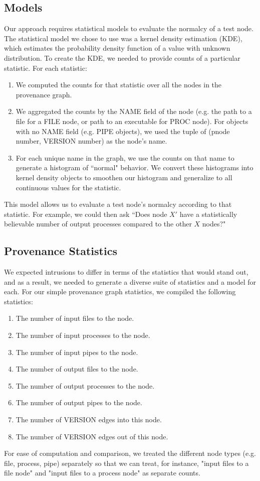 \documentclass[10pt,twocolumn]{article}
\begin{document}
\subsection{Models}
Our approach requires statistical models to evaluate the normalcy of a test node. The statistical model we chose to use was a kernel density estimation (KDE), which estimates the probability density function of a value with unknown distribution. To create the KDE, we needed to provide counts of a particular statistic. For each statistic:
\begin{enumerate}
\item We computed the counts for that statistic over all the nodes in the provenance graph.
\item We aggregated the counts by the NAME field of the node (e.g. the path to a file for a FILE node, or path to an executable for PROC node). For objects with no NAME field (e.g. PIPE objects), we used the tuple of (pnode number, VERSION number) as the node's name.
\item For each unique name in the graph, we use the counts on that name to generate a histogram of ``normal" behavior. We convert these histograms into kernel density objects to smoothen our histogram and generalize to all continuous values for the statistic.
\end{enumerate}

This model allows us to evaluate a test node's normalcy according to that statistic. For example, we could then ask ``Does node $X'$ have a statistically believable number of output processes compared to the other $X$ nodes?"

\subsection{Provenance Statistics}
We expected intrusions to differ in terms of the statistics that would stand out, and as a result, we needed to generate a diverse suite of statistics and a model for each. For our simple provenance graph statistics, we compiled the following statistics:
\begin{enumerate}
\item The number of input files to the node.
\item The number of input processes to the node.
\item The number of input pipes to the node.
\item The number of output files to the node.
\item The number of output processes to the node.
\item The number of output pipes to the node.
\item The number of VERSION edges into this node.
\item The number of VERSION edges out of this node.
\end{enumerate}
For ease of computation and comparison, we treated the different node types (e.g. file, process, pipe) separately so that we can treat, for instance, "input files to a file node" and "input files to a process node" as separate counts.
\end{document}
